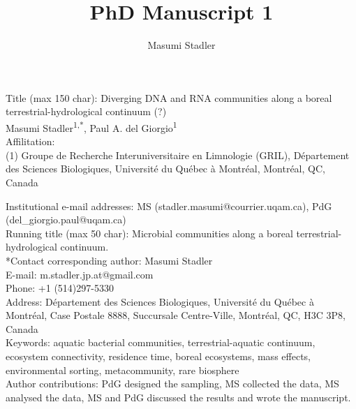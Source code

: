 \documentclass[12pt,a4paper]{article} %
\author{Masumi Stadler}
\title{PhD Manuscript 1}
\begin{document}

\setlength{\parindent}{0cm}
Title (max 150 char): Diverging DNA and RNA communities along a boreal terrestrial-hydrological continuum (?) \\

Masumi Stadler\textsuperscript{1,*}, Paul A. del Giorgio\textsuperscript{1}\\

Affilitation:\\
(1) Groupe de Recherche Interuniversitaire en Limnologie (GRIL), D\'{e}partement des Sciences Biologiques, Universit\'{e} du Qu\'{e}bec \`{a} Montr\'{e}al, Montr\'{e}al, QC, Canada


Institutional e-mail addresses: MS (stadler.masumi@courrier.uqam.ca), PdG (del\_giorgio.paul@uqam.ca)\\

Running title (max 50 char): Microbial communities along a boreal terrestrial-hydrological continuum.\\

*Contact corresponding author: Masumi Stadler \\
E-mail: m.stadler.jp.at@gmail.com \\
Phone: +1 (514)297-5330 \\
Address: D\'{e}partement des Sciences Biologiques, Universit\'{e} du Qu\'{e}bec \`{a} Montr\'{e}al, Case Postale 8888, Succursale Centre-Ville, Montr\'{e}al, QC, H3C 3P8, Canada \\

Keywords: aquatic bacterial communities, terrestrial-aquatic continuum, ecosystem connectivity, residence time, boreal ecosystems, mass effects, environmental sorting, metacommunity, rare biosphere\\

Author contributions: PdG designed the sampling, MS collected the data, MS analysed the data, MS and PdG discussed the results and wrote the manuscript.\\

\newpage

\doublespacing





\setlength{\parindent}{1cm}
\end{document}
